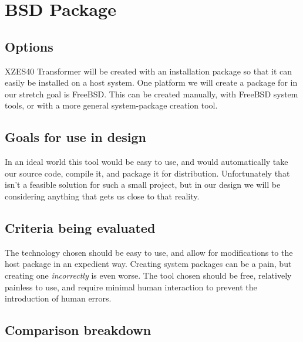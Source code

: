 \section{BSD Package}

\subsection{Options}

XZES40 Transformer will be created with an installation package so that it can easily be installed on a host system.
One platform we will create a package for in our stretch goal is FreeBSD.
This can be created manually, with FreeBSD system tools, or with a more general system-package creation tool.

\subsection{Goals for use in design}

In an ideal world this tool would be easy to use, and would automatically take our source code, compile it, and package it for distribution.
Unfortunately that isn't a feasible solution for such a small project, but in our design we will be considering anything that gets us close to that reality.

\subsection{Criteria being evaluated}

The technology chosen should be easy to use, and allow for modifications to the host package in an expedient way.
Creating system packages can be a pain, but creating one \textit{incorrectly} is even worse.
The tool chosen should be free, relatively painless to use, and require minimal human interaction to prevent the introduction of human errors.

\subsection{Comparison breakdown}


